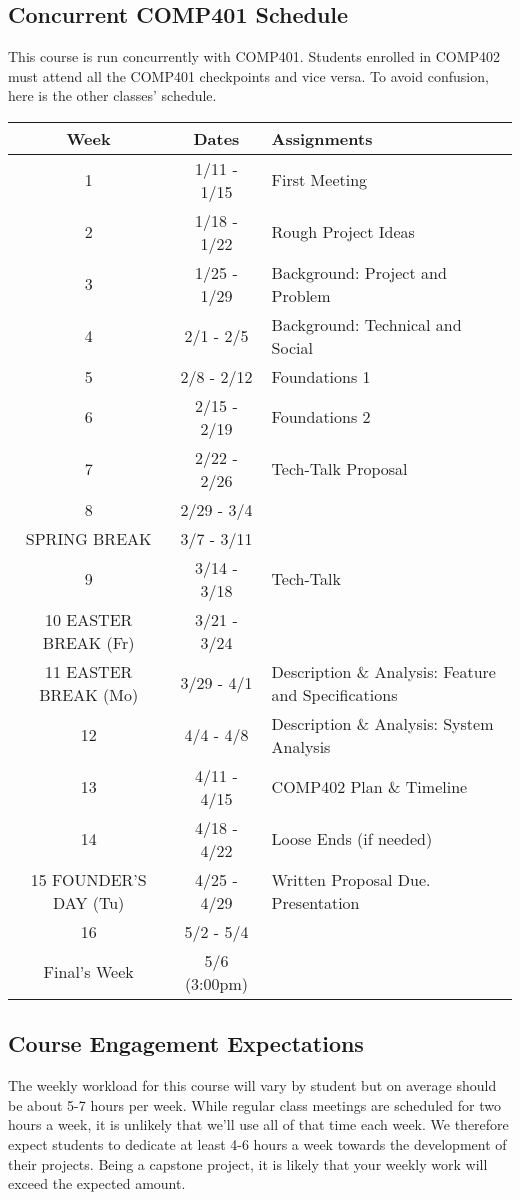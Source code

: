 \documentclass[10pt]{article}
\begin{document}
\subsection{Concurrent COMP401 Schedule}

This course is run concurrently with COMP401. Students enrolled in COMP402 must attend all the COMP401 checkpoints and vice versa. To avoid confusion, here is the other classes' schedule.


\begin{center}
\begin{tabular}{|c|c|l|}
\hline 
Week & Dates & Assignments\\
\hline
1 & 1/11 - 1/15 &  First Meeting \\
\hline
2 & 1/18 - 1/22 & Rough Project Ideas \\
\hline
3 & 1/25 - 1/29 & Background: Project and Problem  \\
\hline
4 & 2/1 - 2/5 & Background: Technical and Social   \\
\hline
5 & 2/8 - 2/12 & Foundations 1 \\
\hline
6 & 2/15 - 2/19 & Foundations 2  \\
\hline
7 & 2/22 - 2/26 &  Tech-Talk Proposal  \\
\hline
8 & 2/29 - 3/4 &   \\
\hline 
SPRING BREAK & 3/7 - 3/11 &  \\
\hline
9 & 3/14 - 3/18 &  Tech-Talk \\
\hline
10 EASTER BREAK (Fr)& 3/21 - 3/24 & \\
\hline
11 EASTER BREAK (Mo)& 3/29 - 4/1 & Description \& Analysis: Feature and Specifications\\
\hline
12 & 4/4 - 4/8 & Description \& Analysis: System Analysis  \\
\hline
13 & 4/11 - 4/15 &  COMP402 Plan \& Timeline  \\
\hline
14 & 4/18 - 4/22 &  Loose Ends (if needed) \\
\hline
15 FOUNDER'S DAY (Tu) & 4/25 - 4/29 & Written Proposal Due. Presentation\\ 
\hline
16 & 5/2 - 5/4 & \\
\hline
Final's Week & 5/6 (3:00pm) &  \\ 
\hline
\end{tabular}
\end{center}

\subsection{Course Engagement Expectations}

The weekly workload for this course will vary by student but on average should be about 5-7 hours per week.  While regular class meetings are scheduled for two hours a week, it is unlikely that we'll use all of that time each week.  We therefore expect students to dedicate at least 4-6 hours a week towards the development of their projects.  Being a capstone project, it is likely that your weekly work will exceed the expected amount.
\end{document}
